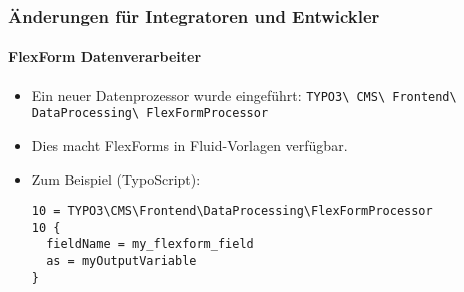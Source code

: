 %

\begin{frame}[fragile]
	\frametitle{Änderungen für Integratoren und Entwickler}
	\framesubtitle{FlexForm Datenverarbeiter}


	\begin{itemize}
		\item Ein neuer Datenprozessor wurde eingeführt:\newline
			\small\texttt{TYPO3\textbackslash
				CMS\textbackslash
				Frontend\textbackslash
				DataProcessing\textbackslash
				FlexFormProcessor}\normalsize
		\item Dies macht FlexForms in Fluid-Vorlagen verfügbar.
		\item Zum Beispiel (TypoScript):
\begin{lstlisting}
10 = TYPO3\CMS\Frontend\DataProcessing\FlexFormProcessor
10 {
  fieldName = my_flexform_field
  as = myOutputVariable
}
\end{lstlisting}

	\end{itemize}

\end{frame}

